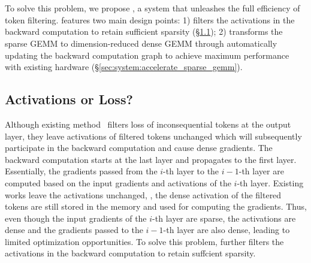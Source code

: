 \section{\solution}

To solve this problem, we propose \solution, a system that unleashes the full efficiency of token filtering. \solution features two main design points: 1) \solution filters the activations in the backward computation to retain sufficient sparsity (\S\ref{sec:system:filter_activation}); 2) \solution transforms the sparse GEMM to dimension-reduced dense GEMM through automatically updating the backward computation graph to achieve maximum performance with existing hardware (\S\ref{sec:system:accelerate_sparse_gemm}).

\subsection{Activations or Loss?} \label{sec:system:filter_activation}

Although existing method~\cite{RHO} filters loss of inconsequential tokens at the output layer, they leave activations of filtered tokens unchanged which will subsequently participate in the backward computation and cause dense gradients. The backward computation starts at the last layer and propagates to the first layer. Essentially, the gradients passed from the $i$-th layer to the $i-1$-th layer are computed based on the input gradients and activations of the $i$-th layer. Existing works leave the activations unchanged, \ie, the dense activation of the filtered tokens are still stored in the memory and used for computing the gradients. Thus, even though the input gradients of the $i$-th layer are sparse, the activations are dense and the gradients passed to the $i-1$-th layer are also dense, leading to limited optimization opportunities. To solve this problem, \solution further filters the activations in the backward computation to retain suffcient sparsity.

